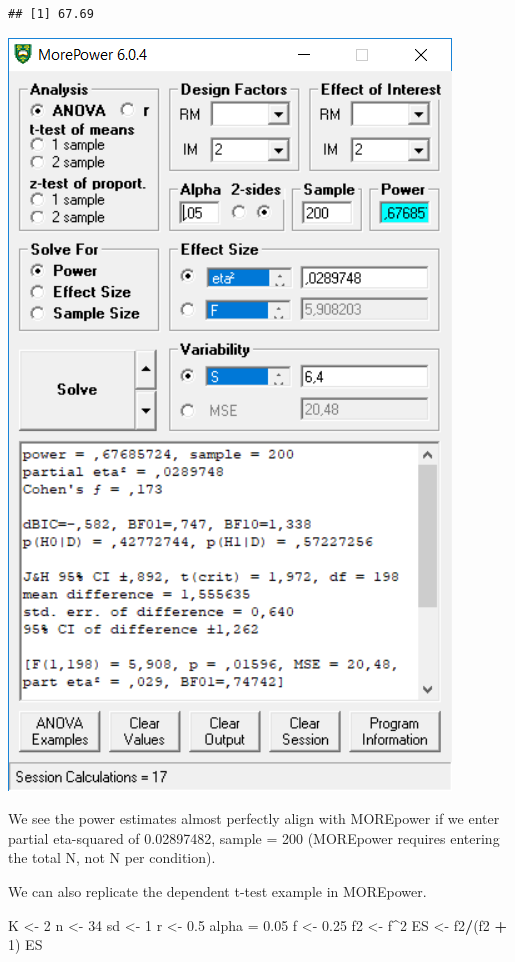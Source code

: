 \documentclass[]{book}
\newenvironment{Shaded}{\begin{snugshade}}{\end{snugshade}}
\newcommand{\DecValTok}[1]{\textcolor[rgb]{0.00,0.00,0.81}{#1}}
\newcommand{\FloatTok}[1]{\textcolor[rgb]{0.00,0.00,0.81}{#1}}
\newcommand{\NormalTok}[1]{#1}
\newcommand{\OperatorTok}[1]{\textcolor[rgb]{0.81,0.36,0.00}{\textbf{#1}}}
\newcommand{\StringTok}[1]{\textcolor[rgb]{0.31,0.60,0.02}{#1}}
\begin{document}
\begin{verbatim}
## [1] 67.69
\end{verbatim}

\includegraphics{screenshots/morepower_1.png}

We see the power estimates almost perfectly align with MOREpower if we enter partial eta-squared of 0.02897482, sample = 200 (MOREpower requires entering the total N, not N per condition).

We can also replicate the dependent t-test example in MOREpower.

\begin{Shaded}
\begin{Highlighting}[]
\NormalTok{K <-}\StringTok{ }\DecValTok{2}
\NormalTok{n <-}\StringTok{ }\DecValTok{34}
\NormalTok{sd <-}\StringTok{ }\DecValTok{1}
\NormalTok{r <-}\StringTok{ }\FloatTok{0.5}
\NormalTok{alpha =}\StringTok{ }\FloatTok{0.05}
\NormalTok{f <-}\StringTok{ }\FloatTok{0.25}
\NormalTok{f2 <-}\StringTok{ }\NormalTok{f}\OperatorTok{^}\DecValTok{2}
\NormalTok{ES <-}\StringTok{ }\NormalTok{f2}\OperatorTok{/}\NormalTok{(f2 }\OperatorTok{+}\StringTok{ }\DecValTok{1}\NormalTok{)}
\NormalTok{ES}
\end{Highlighting}
\end{Shaded}
\end{document}
